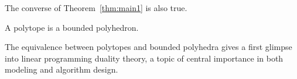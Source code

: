 The converse of Theorem~\ref{thm:main1} is also true.

\begin{theorem}
 A polytope is a bounded polyhedron.
\end{theorem}

The equivalence between polytopes and bounded polyhedra gives a first glimpse into linear programming duality theory, a topic of central importance in both modeling and algorithm design.



